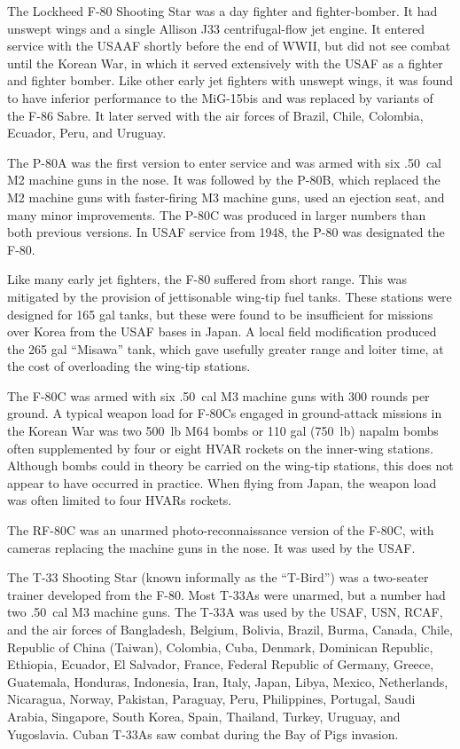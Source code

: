 
The Lockheed F-80 Shooting Star was a day fighter and fighter-bomber. It had unswept wings and a single Allison J33 centrifugal-flow jet engine. It entered service with the USAAF shortly before the end of WWII, but did not see combat until the Korean War, in which it served extensively with the USAF as a fighter and fighter bomber. Like other early jet fighters with unswept wings, it was found to have inferior performance to the MiG-15bis and was replaced by variants of the F-86 Sabre. It later served with the air forces of Brazil, Chile, Colombia, Ecuador, Peru, and Uruguay.

The P-80A was the first version to enter service and was armed with six .50~cal M2 machine guns in the nose. It was followed by the P-80B, which replaced the M2 machine guns with faster-firing M3 machine guns, used an ejection seat, and many minor improvements. The P-80C was produced in larger numbers than both previous versions. In USAF service from 1948, the P-80 was designated the F-80.

Like many early jet fighters, the F-80 suffered from short range. This was mitigated by the provision of jettisonable wing-tip fuel tanks. These stations were designed for 165 gal tanks, but these were found to be insufficient for missions over Korea from the USAF bases in Japan. A local field modification produced the 265 gal “Misawa” tank, which gave usefully greater range and loiter time, at the cost of overloading the wing-tip stations.

The F-80C was armed with six .50~cal M3 machine guns with 300 rounds per ground. A typical weapon load for F-80Cs engaged in ground-attack missions in the Korean War was two 500~lb M64 bombs or 110 gal (750~lb) napalm bombs often supplemented by four or eight HVAR rockets on the inner-wing stations. Although bombs could in theory be carried on the wing-tip stations, this does not appear to have occurred in practice. When flying from Japan, the weapon load was often limited to four HVARs rockets.

The RF-80C was an unarmed photo-reconnaissance version of the F-80C, with cameras replacing the machine guns in the nose. It was used by the USAF.

The T-33 Shooting Star (known informally as the “T-Bird”) was a two-seater trainer developed from the F-80. Most T-33As were unarmed, but a number had two .50~cal M3 machine guns. The T-33A was used by the USAF, USN, RCAF, and the air forces of Bangladesh, Belgium, Bolivia, Brazil, Burma, Canada, Chile, Republic of China (Taiwan), Colombia, Cuba, Denmark, Dominican Republic, Ethiopia, Ecuador, El Salvador, France, Federal Republic of Germany, Greece, Guatemala, Honduras, Indonesia, Iran, Italy, Japan, Libya, Mexico, Netherlands, Nicaragua, Norway, Pakistan, Paraguay, Peru, Philippines, Portugal, Saudi Arabia, Singapore, South Korea, Spain, Thailand, Turkey, Uruguay, and Yugoslavia. Cuban T-33As saw combat during the Bay of Pigs invasion.

